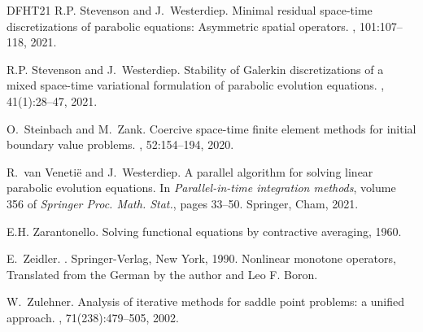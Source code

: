 \documentclass{amsart}
\numberwithin{equation}{section}
\newcommand{\1}{\mathbb 1}
\begin{document}
\begin{thebibliography}{DFHT21}
R.P. Stevenson and J.~Westerdiep.
\newblock Minimal residual space-time discretizations of parabolic equations:
  {A}symmetric spatial operators.
, 101:107--118, 2021.

R.P. Stevenson and J.~Westerdiep.
\newblock Stability of {G}alerkin discretizations of a mixed space-time
  variational formulation of parabolic evolution equations.
, 41(1):28--47, 2021.

O.~Steinbach and M.~Zank.
\newblock Coercive space-time finite element methods for initial boundary value
  problems.
, 52:154--194, 2020.

R.~van Veneti\"{e} and J.~Westerdiep.
\newblock A parallel algorithm for solving linear parabolic evolution
  equations.
\newblock In {\em Parallel-in-time integration methods}, volume 356 of {\em
  Springer Proc. Math. Stat.}, pages 33--50. Springer, Cham, 2021.

E.H. Zarantonello.
\newblock Solving functional equations by contractive averaging, 1960.

E.~Zeidler.
.
\newblock Springer-Verlag, New York, 1990.
\newblock Nonlinear monotone operators, Translated from the German by the
  author and Leo F. Boron.

W.~Zulehner.
\newblock Analysis of iterative methods for saddle point problems: a unified
  approach.
, 71(238):479--505, 2002.

\end{thebibliography}

%
%
\end{document}
